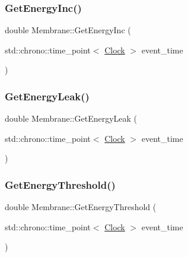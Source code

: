 \mbox{\label{classMembrane_a00e038f0023186139467d490c6cd38a3}} 
\subsubsection{\texorpdfstring{Get\+Energy\+Inc()}{GetEnergyInc()}}
{\footnotesize\ttfamily double Membrane\+::\+Get\+Energy\+Inc (\begin{DoxyParamCaption}\item[{std\+::chrono\+::time\+\_\+point$<$ \mbox{\hyperlink{universe_8h_a0ef8d951d1ca5ab3cfaf7ab4c7a6fd80}{Clock}} $>$}]{event\+\_\+time }\end{DoxyParamCaption})\hspace{0.3cm}{\ttfamily [inline]}}

\mbox{\label{classMembrane_ac6c8d1f7348b24e448e8163260500b89}} 
\subsubsection{\texorpdfstring{Get\+Energy\+Leak()}{GetEnergyLeak()}}
{\footnotesize\ttfamily double Membrane\+::\+Get\+Energy\+Leak (\begin{DoxyParamCaption}\item[{std\+::chrono\+::time\+\_\+point$<$ \mbox{\hyperlink{universe_8h_a0ef8d951d1ca5ab3cfaf7ab4c7a6fd80}{Clock}} $>$}]{event\+\_\+time }\end{DoxyParamCaption})\hspace{0.3cm}{\ttfamily [inline]}}

\mbox{\label{classMembrane_a7ce7398888bdad73ac848a2362261acf}} 
\subsubsection{\texorpdfstring{Get\+Energy\+Threshold()}{GetEnergyThreshold()}}
{\footnotesize\ttfamily double Membrane\+::\+Get\+Energy\+Threshold (\begin{DoxyParamCaption}\item[{std\+::chrono\+::time\+\_\+point$<$ \mbox{\hyperlink{universe_8h_a0ef8d951d1ca5ab3cfaf7ab4c7a6fd80}{Clock}} $>$}]{event\+\_\+time }\end{DoxyParamCaption})\hspace{0.3cm}{\ttfamily [inline]}}

